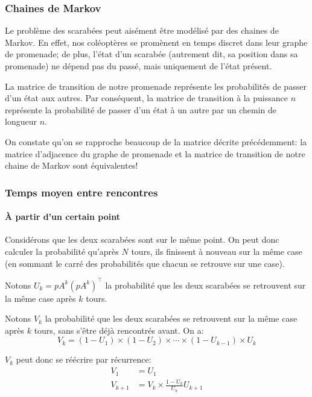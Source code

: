   \subsubsection{Chaines de Markov}
    Le problème des scarabées peut aisément être modélisé par des chaines de
    Markov. En effet, nos coléoptères se promènent en temps discret dans leur
    graphe de promenade; de plus, l'état d'un scarabée (autrement dit, sa
    position dans sa promenade) ne dépend pas du passé, mais uniquement de
    l'état présent.

    La matrice de transition de notre promenade représente les probabilités de
    passer d'un état aux autres. Par conséquent, la matrice de transition à la
    puissance $n$ représente la probabilité de passer d'un état à un autre par
    un chemin de longueur $n$.

    On constate qu'on se rapproche beaucoup de la matrice décrite précédemment:
    la matrice d'adjacence du graphe de promenade et la matrice de transition
    de notre chaine de Markov sont équivalentes!

  \subsubsection{Temps moyen entre rencontres}
    \paragraph{À partir d'un certain point}
      Considérons que les deux scarabées sont sur le même point.  On peut donc
      calculer la probabilité qu'après $N$ tours, ils finissent à nouveau sur
      la même case (en sommant le carré des probabilités que chacun se retrouve
      sur une case).

      Notons $U_k = pA^k(pA^k)^\intercal$ la probabilité que les deux scarabées
      se retrouvent sur la même case après $k$ tours.

      Notons $V_k$ la probabilité que les deux scarabées se retrouvent sur la
      même case après $k$ tours, sans s'être déjà rencontrés avant. On a:
        \[V_k = (1 - U_1) \times (1 - U_2) \times \cdots \times (1 - U_{k - 1})
        \times U_k\]

      $V_k$ peut donc se réécrire par récurrence:
        \begin{align*}
          V_1       &= U_1 \\
          V_{k + 1} &= V_k \times \frac{1 - U_k}{U_k}U_{k + 1}
        \end{align*}

